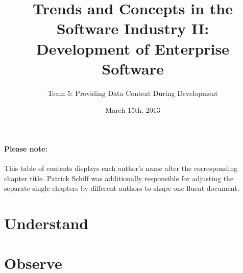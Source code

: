 \documentclass[runningheads]{llncs}
\begin{document}
\mainmatter
\title{Trends and Concepts in the Software Industry II: \\ Development of Enterprise Software}
\author{Team 5: Providing Data Context During Development}
\date{March 15th, 2013}
\maketitle

\setcounter{tocdepth}{2} 

\newpage

\tableofcontents

\paragraph{Please note:} This table of contents displays each author's name after the corresponding chapter title. Patrick Schilf was additionally responsible for adjusting the separate single chapters by different authors to shape one fluent document.

\newpage







\section[Understand (Author: Johan Uhle)]{Understand} \label{sec:UNDERSTAND}


\section[Observe (Author: Johan Uhle)]{Observe} \label{sec:OBSERVE}

\end{document}
